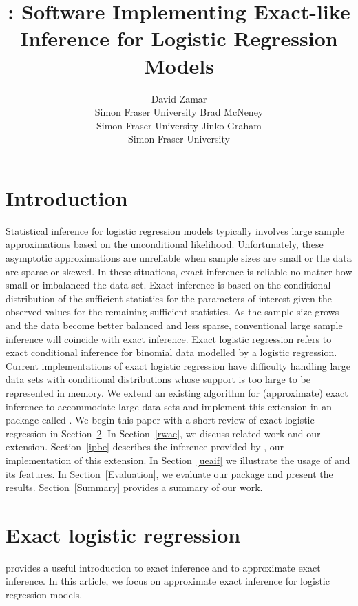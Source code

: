 \documentclass[article, shortnames]{jss}
\author{David Zamar \\Simon Fraser University
  \And Brad McNeney \\Simon Fraser University
  \And Jinko Graham \\Simon Fraser University}
\title{\pkg{elrm}: Software Implementing Exact-like Inference for Logistic Regression Models}
\begin{document}
\section{Introduction} \label{Introduction}

Statistical inference for logistic regression models typically
involves large sample approximations based on the unconditional
likelihood. Unfortunately, these asymptotic approximations are
unreliable when sample sizes are small or the data are sparse or
skewed. In these situations, exact inference is reliable no matter
how small or imbalanced the data set. Exact inference is based on
the conditional distribution of the sufficient statistics for the
parameters of interest given the observed values for the remaining
sufficient statistics. As the sample size grows and the data
become better balanced and less sparse, conventional large sample
inference will coincide with exact inference. Exact logistic
regression refers to exact conditional inference for binomial data
modelled by a logistic regression. Current implementations of
exact logistic regression have difficulty handling large data sets
with conditional distributions whose support is too large to be
represented in memory. We extend an existing algorithm for
(approximate) exact inference to accommodate large data sets and
implement this extension in an  \citep{R}
package called
. We begin this paper with a short review of exact
logistic regression in Section~\ref{elr}. In
Section~\ref{rwae}, we discuss related work
and our extension. Section~\ref{ipbe}
describes the inference provided by , our implementation
of this extension. In Section~\ref{ueaif} we
illustrate the usage of  and its features.
In Section~\ref{Evaluation}, we evaluate our package and present the results.
Section~\ref{Summary} provides a summary of our work.

\section{Exact logistic regression} \label{elr}

\citet{Hirji:2006} provides a useful introduction to
exact inference and to approximate exact inference.
In this article, we focus on approximate exact inference
for logistic regression models.
\end{document}
